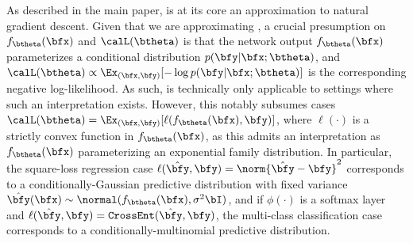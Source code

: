 As described in the main paper, \KFAC \cite{martens2015optimizing} is at its core an approximation to natural gradient descent. Given that we are approximating \NGD, a crucial presumption on $f_{\btheta}(\bfx)$ and $\calL(\btheta)$ is that the network output $f_{\btheta}(\bfx)$ parameterizes a conditional distribution $p(\bfy|\bfx; \btheta)$, and $\calL(\btheta) \propto \Ex_{(\bfx, \bfy)}[-\log p(\bfy|\bfx; \btheta)]$ is the corresponding negative log-likelihood. As such, \KFAC is technically only applicable to settings where such an interpretation exists. However, this notably subsumes cases $\calL(\btheta) = \Ex_{(\bfx, \bfy)}[\ell(f_{\btheta}(\bfx), \bfy)]$, where $\ell(\cdot)$ is a strictly convex function in $f_{\btheta}(\bfx)$, as this admits an interpretation as $f_{\btheta}(\bfx)$ parameterizing an exponential family distribution. In particular, the square-loss regression case $\ell(\hat\bfy, \bfy) = \norm{\hat\bfy - \bfy}^2$ corresponds to a conditionally-Gaussian predictive distribution with fixed variance $\hat\bfy(\bfx) \sim \normal(f_{\btheta}(\bfx), \sigma^2 \bI)$, and if $\phi(\cdot)$ is a softmax layer and $\ell(\hat\bfy, \bfy) = \texttt{CrossEnt}(\hat\bfy, \bfy)$, the multi-class classification case corresponds to a conditionally-multinomial predictive distribution.

